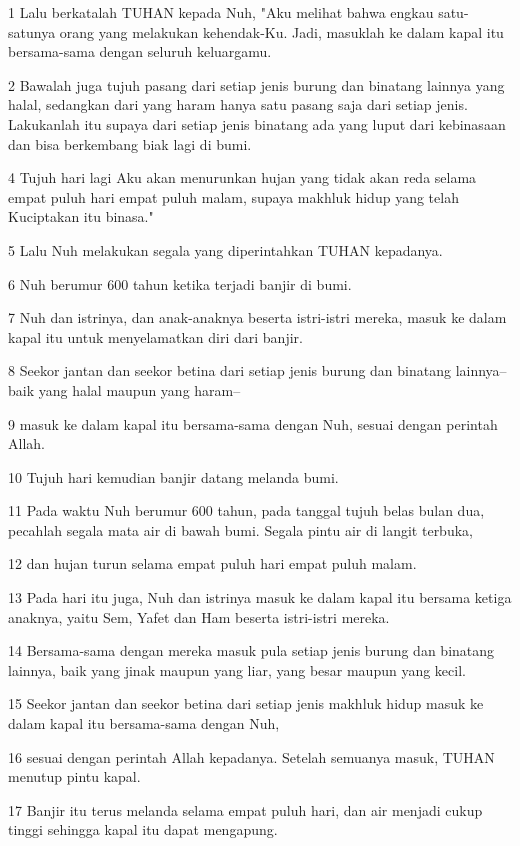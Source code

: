 \par 1 Lalu berkatalah TUHAN kepada Nuh, "Aku melihat bahwa engkau satu-satunya orang yang melakukan kehendak-Ku. Jadi, masuklah ke dalam kapal itu bersama-sama dengan seluruh keluargamu.
\par 2 Bawalah juga tujuh pasang dari setiap jenis burung dan binatang lainnya yang halal, sedangkan dari yang haram hanya satu pasang saja dari setiap jenis. Lakukanlah itu supaya dari setiap jenis binatang ada yang luput dari kebinasaan dan bisa berkembang biak lagi di bumi.
\par 4 Tujuh hari lagi Aku akan menurunkan hujan yang tidak akan reda selama empat puluh hari empat puluh malam, supaya makhluk hidup yang telah Kuciptakan itu binasa."
\par 5 Lalu Nuh melakukan segala yang diperintahkan TUHAN kepadanya.
\par 6 Nuh berumur 600 tahun ketika terjadi banjir di bumi.
\par 7 Nuh dan istrinya, dan anak-anaknya beserta istri-istri mereka, masuk ke dalam kapal itu untuk menyelamatkan diri dari banjir.
\par 8 Seekor jantan dan seekor betina dari setiap jenis burung dan binatang lainnya--baik yang halal maupun yang haram--
\par 9 masuk ke dalam kapal itu bersama-sama dengan Nuh, sesuai dengan perintah Allah.
\par 10 Tujuh hari kemudian banjir datang melanda bumi.
\par 11 Pada waktu Nuh berumur 600 tahun, pada tanggal tujuh belas bulan dua, pecahlah segala mata air di bawah bumi. Segala pintu air di langit terbuka,
\par 12 dan hujan turun selama empat puluh hari empat puluh malam.
\par 13 Pada hari itu juga, Nuh dan istrinya masuk ke dalam kapal itu bersama ketiga anaknya, yaitu Sem, Yafet dan Ham beserta istri-istri mereka.
\par 14 Bersama-sama dengan mereka masuk pula setiap jenis burung dan binatang lainnya, baik yang jinak maupun yang liar, yang besar maupun yang kecil.
\par 15 Seekor jantan dan seekor betina dari setiap jenis makhluk hidup masuk ke dalam kapal itu bersama-sama dengan Nuh,
\par 16 sesuai dengan perintah Allah kepadanya. Setelah semuanya masuk, TUHAN menutup pintu kapal.
\par 17 Banjir itu terus melanda selama empat puluh hari, dan air menjadi cukup tinggi sehingga kapal itu dapat mengapung.
